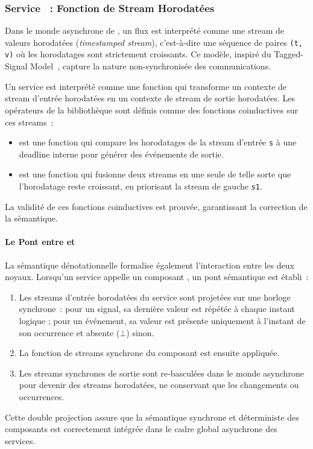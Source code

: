 \subsubsection{Service \GRFRP~: Fonction de Stream Horodatées}

Dans le monde asynchrone de \GRFRP, un flux est interprété comme une stream de valeurs horodatées
(\emph{timestamped stream}), c'est-à-dire une séquence de paires \texttt{(t, v)} où les horodatages
sont strictement croissants. Ce modèle, inspiré du Tagged-Signal
Model~\cite{DBLP:journals/tcad/LeeS98}, capture la nature non-synchronisée des communications.

Un service est interprété comme une fonction qui transforme un contexte de stream d'entrée
horodatées en un contexte de stream de sortie horodatées. Les opérateurs de la bibliothèque \GReact
sont définis comme des fonctions coinductives sur ces streams~:
\begin{itemize}
      \item {} est une fonction qui compare les horodatages de la
            stream d'entrée \texttt{s} à une deadline interne pour générer des événements de sortie.
      \item {} est une fonction qui fusionne deux streams en une
            seule de telle sorte que l'horodatage reste croissant, en priorisant la stream de
            gauche \texttt{s1}.
\end{itemize}
La validité de ces fonctions coinductives est prouvée, garantissant la correction de la sémantique.

\paragraph{Le Pont entre \GRFRP et \GRSync} La sémantique dénotationnelle formalise également
l'interaction entre les deux noyaux. Lorsqu'un service \GRFRP appelle un composant \GRSync, un pont
sémantique est établi~:
\begin{enumerate}
      \item Les streams d'entrée horodatées du service sont projetées sur une horloge synchrone~:
            pour un signal, sa dernière valeur est répétée à chaque instant logique ; pour un
            événement, sa valeur est présente uniquement à l'instant de son occurrence et absente
            ($\bot$) sinon.
      \item La fonction de streams synchrone du composant \GRSync est ensuite appliquée.
      \item Les streams synchrones de sortie sont re-basculées dans le monde asynchrone pour devenir
            des streams horodatées, ne conservant que les changements ou occurrences.
\end{enumerate}
Cette double projection assure que la sémantique synchrone et déterministe des composants est
correctement intégrée dans le cadre global asynchrone des services.

